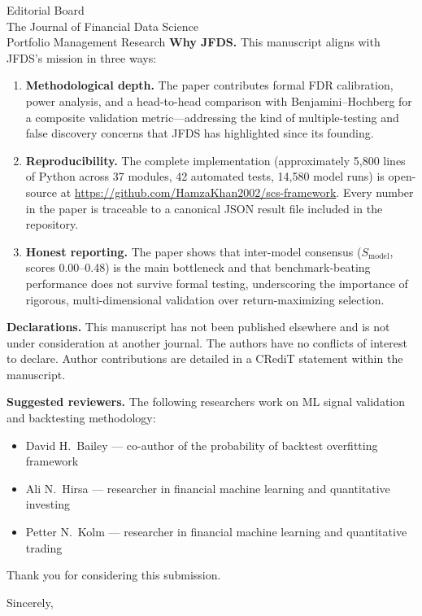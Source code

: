 \documentclass[12pt,a4paper]{letter}
\begin{document}
\begin{letter}{Editorial Board\\The Journal of Financial Data Science\\Portfolio Management Research}
\textbf{Why JFDS.} This manuscript aligns with JFDS's mission in three ways:

\begin{enumerate}
    \item \textbf{Methodological depth.} The paper contributes formal FDR calibration, power analysis, and a head-to-head comparison with Benjamini--Hochberg for a composite validation metric---addressing the kind of multiple-testing and false discovery concerns that JFDS has highlighted since its founding.

    \item \textbf{Reproducibility.} The complete implementation (approximately 5{,}800 lines of Python across 37 modules, 42 automated tests, 14{,}580 model runs) is open-source at \url{https://github.com/HamzaKhan2002/scs-framework}. Every number in the paper is traceable to a canonical JSON result file included in the repository.

    \item \textbf{Honest reporting.} The paper shows that inter-model consensus ($S_{\mathrm{model}}$, scores 0.00--0.48) is the main bottleneck and that benchmark-beating performance does not survive formal testing, underscoring the importance of rigorous, multi-dimensional validation over return-maximizing selection.
\end{enumerate}

\textbf{Declarations.} This manuscript has not been published elsewhere and is not under consideration at another journal. The authors have no conflicts of interest to declare. Author contributions are detailed in a CRediT statement within the manuscript.

\textbf{Suggested reviewers.} The following researchers work on ML signal validation and backtesting methodology:
\begin{itemize}
    \item David H.~Bailey --- co-author of the probability of backtest overfitting framework
    \item Ali N.~Hirsa --- researcher in financial machine learning and quantitative investing
    \item Petter N.~Kolm --- researcher in financial machine learning and quantitative trading
\end{itemize}

Thank you for considering this submission.

\closing{Sincerely,}

\end{letter}
\end{document}
